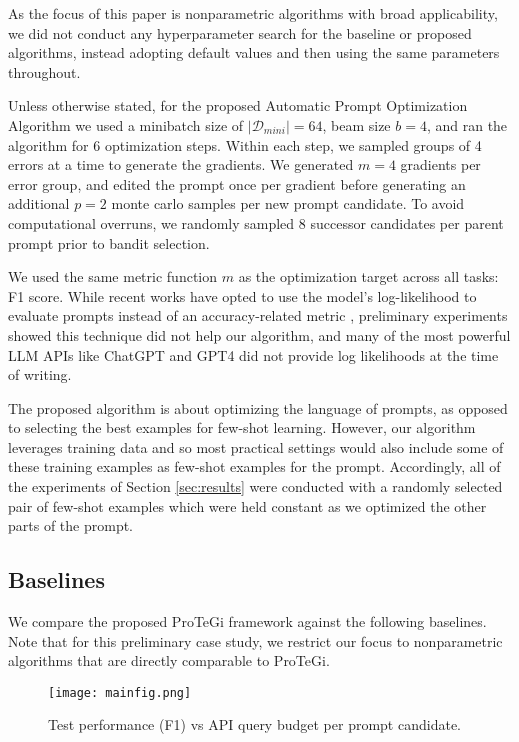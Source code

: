 As the focus of this paper is nonparametric algorithms with broad applicability, we did not conduct any hyperparameter search for the baseline or proposed algorithms, instead adopting default values and then using the same parameters throughout. 

Unless otherwise stated, for the proposed Automatic Prompt Optimization Algorithm we used a minibatch size of $\vert \mathcal{D}_{mini} \vert = 64$, beam size $b=4$, and ran the algorithm for 6 optimization steps. Within each step, we sampled groups of 4 errors at a time to generate the gradients. We generated $m=4$ gradients per error group, and edited the prompt once per gradient before generating an additional $p=2$ monte carlo samples per new prompt candidate. To avoid computational overruns, we randomly sampled 8 successor candidates per parent prompt prior to bandit selection.

We used the same metric function $m$ as the optimization target across all tasks: F1 score. While recent works have opted to use the model's log-likelihood to evaluate prompts instead of an accuracy-related metric \cite{lu2021fantastically,prasad2022grips,zhou2022large}, preliminary experiments showed this technique did not help our algorithm, and many of the most powerful LLM APIs like ChatGPT and GPT4 did not provide log likelihoods at the time of writing. 

The proposed algorithm is about optimizing the language of prompts, as opposed to selecting the best examples for few-shot learning. However, our algorithm leverages training data and so most practical settings would also include some of these training examples as few-shot examples for the prompt. Accordingly, all of the experiments of Section \ref{sec:results} were conducted with a randomly selected pair of few-shot examples which were held constant as we optimized the other parts of the prompt.

\subsection{Baselines}

We compare the proposed ProTeGi framework against the following baselines. Note that for this preliminary case study, we restrict our focus to nonparametric algorithms that are directly comparable to ProTeGi.
\begin{figure*}
\centering
\texttt{[image: mainfig.png]}
\caption{Test performance (F1) vs API query budget per prompt candidate.}
\label{fig:mainresult}
\end{figure*}

